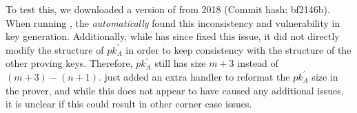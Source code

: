 To test this, we downloaded a version of \libsnark from 2018 (Commit hash: bf2146b).
When running \SnarkFuzzer, the  \textit{automatically} found this inconsistency and vulnerability in key generation. Additionally, while \libsnark has since fixed this issue, it did not directly modify the structure of $pk_{A}^{'}$ in order to keep consistency with the structure of the other proving keys. Therefore, $pk_{A}^{'}$ still has size $m + 3$ instead of $(m + 3) - (n + 1)$. \libsnark just added an extra handler to reformat the $pk_{A}^{'}$ size in the prover, and while this does not appear to have caused any additional issues, it is unclear if this could result in other corner case issues.


